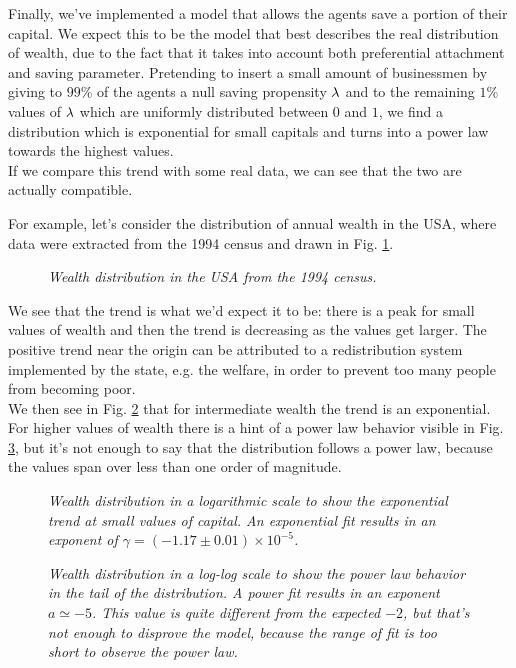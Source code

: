 Finally, we've implemented a model that allows the agents save a portion of their capital.
We expect this to be the model that best describes the real distribution of wealth, due to the fact that it takes into account both preferential attachment and saving parameter.
Pretending to insert a small amount of businessmen by giving to $99 \%$ of the agents a null saving propensity $\lambda$ and to the remaining $1 \%$ values of $\lambda$ which are uniformly distributed between $0$ and $1$, we find a distribution which is exponential for small capitals and turns into a power law towards the highest values. \\
If we compare this trend with some real data, we can see that the two are actually compatible.

For example, let's consider the distribution of annual wealth in the USA, where data were extracted from the 1994 census and drawn in Fig. \ref{fig:gloabl_realData}.
\begin{figure}[H]
    \centering
    \scalebox{.7}{}
    \caption{\emph{Wealth distribution in the USA from the 1994 census.}}
    \label{fig:gloabl_realData}
\end{figure}
We see that the trend is what we'd expect it to be: there is a peak for small values of wealth and then the trend is decreasing as the values get larger.
The positive trend near the origin can be attributed to a redistribution system implemented by the state, e.g. the welfare, in order to prevent too many people from becoming poor. \\
We then see in Fig. \ref{fig:real_head} that for intermediate wealth the trend is an exponential.
For higher values of wealth there is a hint of a power law behavior visible in Fig. \ref{fig:real_tail}, but it's not enough to say that the distribution follows a power law, because the values span over less than one order of magnitude.
\begin{figure}[H]
    \centering
    \scalebox{.7}{}
	 \caption{\emph{Wealth distribution in a logarithmic scale to show the exponential trend at small values of capital.
                     An exponential fit results in an exponent of $\gamma = (-1.17 \pm 0.01)\times 10^{-5}$.}}
    \label{fig:real_head}
\end{figure}
\begin{figure}[H]
    \centering
    \scalebox{.7}{}
    \caption{\emph{Wealth distribution in a log-log scale to show the power law behavior in the tail of the distribution.
                    A power fit results in an exponent $a \simeq -5$.
                    This value is quite different from the expected $-2$, but that's not enough to disprove the model, because the range of fit is too short to observe the power law.}}
    \label{fig:real_tail}
\end{figure}
